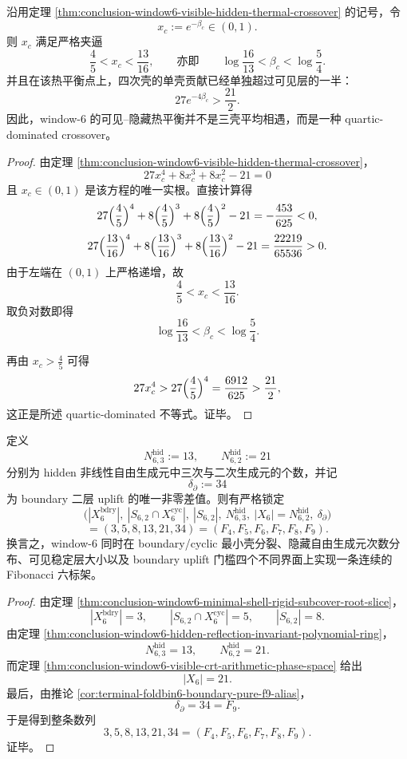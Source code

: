 \begin{corollary}\label{cor:conclusion-window6-thermal-crossover-quartic-dominated}
沿用定理 \ref{thm:conclusion-window6-visible-hidden-thermal-crossover} 的记号，令
\[
x_c:=e^{-\beta_c}\in(0,1).
\]
则 \(x_c\) 满足严格夹逼
\[
\frac45<x_c<\frac{13}{16},
\qquad\text{亦即}\qquad
\log\frac{16}{13}<\beta_c<\log\frac54.
\]
并且在该热平衡点上，四次壳的单壳贡献已经单独超过可见层的一半：
\[
27e^{-4\beta_c}>\frac{21}{2}.
\]
因此，window-\(6\) 的可见--隐藏热平衡并不是三壳平均相遇，而是一种 quartic-dominated crossover。
\end{corollary}
\begin{proof}
由定理 \ref{thm:conclusion-window6-visible-hidden-thermal-crossover}，
\[
27x_c^4+8x_c^3+8x_c^2-21=0
\]
且 \(x_c\in(0,1)\) 是该方程的唯一实根。直接计算得
\[
27\Bigl(\frac45\Bigr)^4+8\Bigl(\frac45\Bigr)^3+8\Bigl(\frac45\Bigr)^2-21
=-\frac{453}{625}<0,
\]
\[
27\Bigl(\frac{13}{16}\Bigr)^4+8\Bigl(\frac{13}{16}\Bigr)^3+8\Bigl(\frac{13}{16}\Bigr)^2-21
=\frac{22219}{65536}>0.
\]
由于左端在 \((0,1)\) 上严格递增，故
\[
\frac45<x_c<\frac{13}{16}.
\]
取负对数即得
\[
\log\frac{16}{13}<\beta_c<\log\frac54.
\]

再由 \(x_c>\frac45\) 可得
\[
27x_c^4>27\Bigl(\frac45\Bigr)^4=\frac{6912}{625}>\frac{21}{2},
\]
这正是所述 quartic-dominated 不等式。证毕。
\end{proof}

\begin{theorem}\label{thm:conclusion-window6-fibonacci-sixframe-lock}
定义
\[
N_{6,3}^{\mathrm{hid}}:=13,
\qquad
N_{6,2}^{\mathrm{hid}}:=21
\]
分别为 hidden 非线性自由生成元中三次与二次生成元的个数，并记
\[
\delta_{\partial}:=34
\]
为 boundary 二层 uplift 的唯一非零差值。则有严格锁定
\[
\bigl(
|X_6^{\mathrm{bdry}}|,
\ |S_{6,2}\cap X_6^{\mathrm{cyc}}|,
\ |S_{6,2}|,
\ N_{6,3}^{\mathrm{hid}},
\ |X_6|=N_{6,2}^{\mathrm{hid}},
\ \delta_{\partial}
\bigr)
\]
\[
=
(3,5,8,13,21,34)
=(F_4,F_5,F_6,F_7,F_8,F_9).
\]
换言之，window-\(6\) 同时在 boundary/cyclic 最小壳分裂、隐藏自由生成元次数分布、可见稳定层大小以及 boundary uplift 门槛四个不同界面上实现一条连续的 Fibonacci 六标架。
\end{theorem}
\begin{proof}
由定理 \ref{thm:conclusion-window6-minimal-shell-rigid-subcover-root-slice}，
\[
|X_6^{\mathrm{bdry}}|=3,
\qquad
|S_{6,2}\cap X_6^{\mathrm{cyc}}|=5,
\qquad
|S_{6,2}|=8.
\]
由定理 \ref{thm:conclusion-window6-hidden-reflection-invariant-polynomial-ring}，
\[
N_{6,3}^{\mathrm{hid}}=13,
\qquad
N_{6,2}^{\mathrm{hid}}=21.
\]
而定理 \ref{thm:conclusion-window6-visible-crt-arithmetic-phase-space} 给出
\[
|X_6|=21.
\]
最后，由推论 \ref{cor:terminal-foldbin6-boundary-pure-f9-alias}，
\[
\delta_{\partial}=34=F_9.
\]
于是得到整条数列
\[
3,5,8,13,21,34=(F_4,F_5,F_6,F_7,F_8,F_9).
\]
证毕。
\end{proof}

